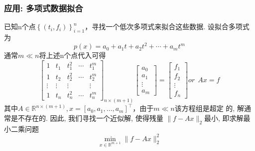 \documentclass[12pt,a4paper]{article}
\begin{document}
\subsubsection{应用: 多项式数据拟合}
\noindent 已知n个点$\left\{\left(t_{i}, f_{i}\right)\right\}_{i=1}^{n}$，寻找一个低次多项式来拟合这些数据. 设拟合多项式为
$$
p(x)=a_{0}+a_{1} t+a_{2} t^{2}+\cdots+a_{m} t^{m}
$$
通常$m \ll n$将上述n个点代入可得
$$
\left[\begin{array}{ccccc}
{1} & {t_{1}} & {t_{1}^{2}} & {\cdots} & {t_{1}^{m}} \\
{1} & {t_{2}} & {t_{2}^{2}} & {\cdots} & {t_{2}^{m}} \\ {\vdots} & {\vdots} & {\vdots} & {} & {\vdots} \\
{1} & {t_{n}} & {t_{n}^{2}} & {\cdots} & {t_{n}^{m}}\end{array}\right]_{n \times(m+1)}\left[\begin{array}{c}{a_{0}} \\ 
{a_{1}} \\ 
{\vdots} \\ 
{a_{m}}
\end{array}\right]=\left[\begin{array}{c}{f_{1}} \\ {f_{2}} \\ {\vdots} \\ {f_{n}}\end{array}\right] or ~~A x=f
$$
其中$A \in \mathbb{R}^{n \times(m+1)}, x=\left[a_{0}, a_{1}, \ldots, a_{m}\right]^{\top}$，由于$m \ll n$该方程组是超定 的, 解通常是不存在的. 因此, 我们寻找一个近似解, 使得残量
$\|f-A x\|_{2}$最小, 即求解最小二乘问题
$$
\min _{x \in \mathbb{R}^{m+1}}\|f-A x\|_{2}^{2}
$$
\end{document}

